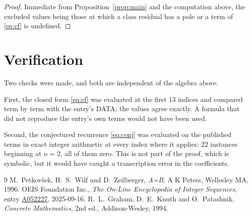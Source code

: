 \documentclass[11pt,a4paper]{article}
\theoremstyle{plain}
\theoremstyle{definition}
\begin{document}
\begin{proof}
Immediate from Proposition~\ref{prop:main} and the computation above, the excluded values
being those at which a class residual has a pole or a term of \eqref{eq:cf} is undefined.
\end{proof}

\section{Verification}

Two checks were made, and both are independent of the algebra above.

First, the closed form \eqref{eq:cf} was evaluated at the first $13$ indices and
compared term by term with the entry's DATA; the values agree exactly. A formula that did
not reproduce the entry's own terms would not have been used.

Second, the conjectured recurrence \eqref{eq:conj} was evaluated on the published terms in
exact integer arithmetic at every index where it applies: $22$ instances beginning at
$n=2$, all of them zero. This is not part of the proof, which is symbolic, but it
would have caught a transcription error in the coefficients.

\begin{thebibliography}{9}
 M.~Petkov\v{s}ek, H.~S.~Wilf and D.~Zeilberger, \emph{A=B}, A K Peters,
Wellesley MA, 1996.
 OEIS Foundation Inc., \emph{The On-Line Encyclopedia of Integer Sequences},
entry \href{https://oeis.org/A052227}{A052227}, 2025-09-16.
 R.~L.~Graham, D.~E.~Knuth and O.~Patashnik, \emph{Concrete Mathematics},
2nd ed., Addison-Wesley, 1994.
\end{thebibliography}
\end{document}
